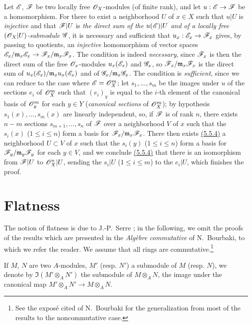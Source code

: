 \begin{env}[5.5.5]
\label{env-0.5.5.5}
Let $\mathscr{E}$, $\mathscr{F}$ be two locally free $\mathscr{O}_X$-modules (of finite rank), and let
$u:\mathscr{E}\to\mathscr{F}$ be a homomorphism. For there to exist a neighborhood $U$ of $x\in X$ such
that $u|U$ is {\em injective} and that $\mathscr{F}|U$ is {\em the direct sum of the
$u(\mathscr{E})|U$ and of a locally free $(\mathscr{O}_X|U)$-submodule $\mathscr{G}$}, it is necessary and
sufficient that $u_x:\mathscr{E}_x\to\mathscr{F}_x$ gives, by passing to quotients, an {\em injective}
homomorphism of vector spaces
$\mathscr{E}_x/\mathfrak{m}_x\mathscr{E}_x\to\mathscr{F}_x/\mathfrak{m}_x\mathscr{F}_x$. The condition is indeed
{\em necessary}, since $\mathscr{F}_x$ is then the direct sum of the free $\mathscr{O}_x$-modules
$u_x(\mathscr{E}_x)$ and $\mathscr{G}_x$, so $\mathscr{F}_x/\mathfrak{m}_x\mathscr{F}_x$ is the direct sum of
$u_x(\mathscr{E}_x)/\mathfrak{m}_x u_x(\mathscr{E}_x)$ and of $\mathscr{G}_x/\mathfrak{m}_x\mathscr{G}_x$. The
condition is {\em sufficient}, since we can reduce to the case where $\mathscr{E}=\mathscr{O}_X^m$; let
$s_1,\dots,s_m$ be the images under $u$ of the sections $e_i$ of $\mathscr{O}_X^m$ such that
$(e_i)_y$ is equal to the $i$-th element of the canonical basis of $\mathscr{O}_y^m$ for each
$y\in Y$ ({\em canonical sections} of $\mathscr{O}_X^m$); by hypothesis $s_1(x),\dots,s_m(x)$ are
linearly independent, so, if $\mathscr{F}$ is of rank $n$, there exists $n-m$ sections
$s_{m+1},\dots,s_n$ of $\mathscr{F}$ over a neighborhood $V$ of $x$ such that the $s_i(x)$
($1\leqslant i\leqslant n$) form a basis for $\mathscr{F}_x/\mathfrak{m}_x\mathscr{F}_x$. There then
exists \hyperref[env-0.5.5.4]{(5.5.4)} a neighborhood $U\subset V$ of $x$ such that the $s_i(y)$
($1\leqslant i\leqslant n$) form a basis for $\mathscr{F}_y/\mathfrak{m}_y\mathscr{F}_y$ for each
$y\in V$, and we conclude \hyperref[env-0.5.5.4]{(5.5.4)} that there is an isomorphism from $\mathscr{F}|U$ to
$\mathscr{O}_X^n|U$, sending the $s_i|U$ ($1\leqslant i\leqslant m$) to the $e_i|U$, which finishes
the proof.
\end{env}

\section{Flatness}
\label{section-flatness}

\begin{env}[6.0]
\label{env-0.6.0.0}
The notion of flatness is due to J.-P.~Serre \cite{I-16}; in the following, we omit the
proofs of the results which are presented in the {\em Alg\`ebre commutative} of N.~Bourbaki,
to which we refer the reader. We assume that all rings are commutative.\footnote{See the
expos\'e cited of N.~Bourbaki for the generalization from most of the results to the
noncommutative case.}

If $M$, $N$ are two $A$-modules, $M'$ (resp. $N'$) a submodule of $M$ (resp. $N$), we denote
by $\Im(M'\otimes_A N')$ the submodule of $M\otimes_A N$, the image under the canonical map
$M'\otimes_A N'\to M\otimes_A N$.
\end{env}

